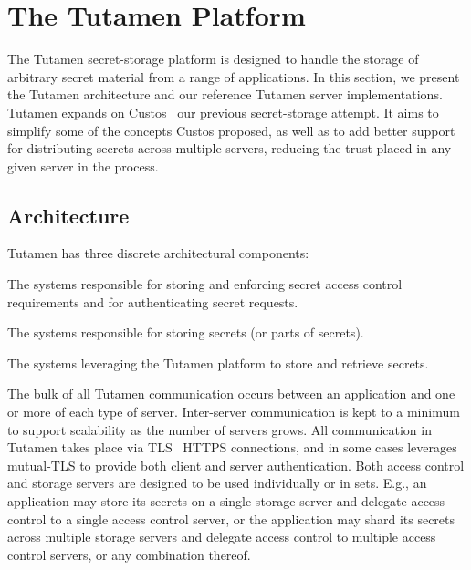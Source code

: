 \section{The Tutamen Platform}
\label{sec:tutamen}

The Tutamen secret-storage platform is designed to handle the storage
of arbitrary secret material from a range of applications.  In this
section, we present the Tutamen architecture and our reference Tutamen
server implementations. Tutamen expands on Custos~\cite{custos-trios}
our previous secret-storage attempt. It aims to simplify some of the
concepts Custos proposed, as well as to add better support for
distributing secrets across multiple servers, reducing the trust
placed in any given server in the process.

\subsection{Architecture}
\label{sec:tutamen:arch}

Tutamen has three discrete architectural components:

\begin{packed_desc}
\item[Access Control Servers (ACS):] The systems responsible for
  storing and enforcing secret access control requirements and for
  authenticating secret requests.
\item[Storage Servers (SS):] The systems responsible for storing
  secrets (or parts of secrets).
\item[Applications:] The systems leveraging the Tutamen platform to
  store and retrieve secrets.
\end{packed_desc}

The bulk of all Tutamen communication occurs between an application
and one or more of each type of server. Inter-server communication is
kept to a minimum to support scalability as the number of servers
grows. All communication in Tutamen takes place via
TLS~\cite{dierks2008} HTTPS connections, and in some cases leverages
mutual-TLS to provide both client and server authentication. Both
access control and storage servers are designed to be used
individually or in sets. E.g., an application may store its secrets on
a single storage server and delegate access control to a single access
control server, or the application may shard its secrets across
multiple storage servers and delegate access control to multiple
access control servers, or any combination thereof.

